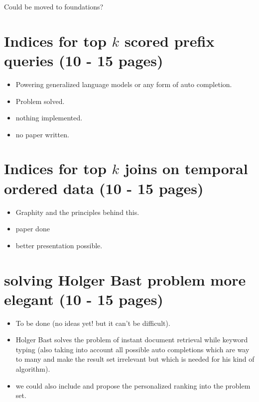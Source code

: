 \documentclass[•]{book}
\begin{document}
Could be moved to foundations?
\chapter{Indices for top $k$ scored prefix queries (10 - 15 pages)}
\begin{itemize}
\item Powering generalized language models or any form of auto completion. 
\item Problem solved. 
\item nothing implemented.
\item no paper written.
\end{itemize}

\chapter{Indices for top $k$ joins on temporal ordered data (10 - 15 pages)}
\begin{itemize}
\item Graphity and the principles behind this. 
\item paper done 
\item better presentation possible. 
\end{itemize}
\chapter{solving Holger Bast problem more elegant (10 - 15 pages)}
\begin{itemize}
\item To be done (no ideas yet! but it can't be difficult).
\item Holger Bast solves the problem of instant document retrieval while keyword typing \cite{RW:Bast:2006} (also taking into account all possible auto completions which are way to many and make the result set irrelevant but which is needed for his kind of algorithm). 
\item we could also include and propose the personalized ranking into the problem set.
\end{itemize}
\end{document}
